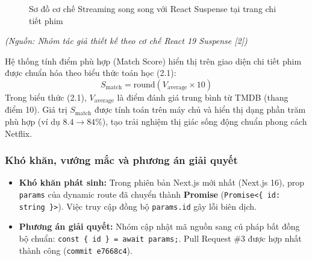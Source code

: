 \documentclass[13pt,a4paper]{extarticle}
\begin{document}
\begin{figure}[H]
\centering
{}
\caption{Sơ đồ cơ chế Streaming song song với React Suspense tại trang chi tiết phim}
\label{fig:streaming}
\end{figure}
\begin{flushleft}\small\textit{(Nguồn: Nhóm tác giả thiết kế theo cơ chế React 19 Suspense [2])}\end{flushleft}

Hệ thống tính điểm phù hợp (Match Score) hiển thị trên giao diện chi tiết phim được chuẩn hóa theo biểu thức toán học (2.1):
\begin{equation}
S_{\text{match}} = \text{round}(V_{\text{average}} \times 10)
\label{eq:match_score}
\end{equation}
Trong biểu thức (2.1), $V_{\text{average}}$ là điểm đánh giá trung bình từ TMDB (thang điểm 10). Giá trị $S_{\text{match}}$ được tính toán trên máy chủ và hiển thị dạng phần trăm phù hợp (ví dụ $8.4 \rightarrow 84\%$), tạo trải nghiệm thị giác sống động chuẩn phong cách Netflix.

\subsubsection{Khó khăn, vướng mắc và phương án giải quyết}
\begin{itemize}[noitemsep]
    \item \textbf{Khó khăn phát sinh:} Trong phiên bản Next.js mới nhất (Next.js 16), prop \texttt{params} của dynamic route đã chuyển thành \textbf{Promise} (\texttt{Promise<\{ id: string \}>}). Việc truy cập đồng bộ \texttt{params.id} gây lỗi biên dịch.
    \item \textbf{Phương án giải quyết:} Nhóm cập nhật mã nguồn sang cú pháp bất đồng bộ chuẩn: \texttt{const \{ id \} = await params;}. Pull Request \#3 được hợp nhất thành công (\texttt{commit e7668c4}).
\end{itemize}
\end{document}
